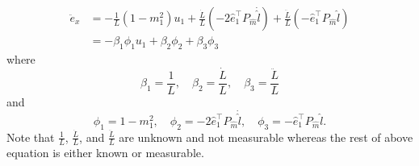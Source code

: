\begin{align}
\ddot{e}_x&=-\frac{1}{L}(1-m_1^2)u_1+\frac{\dot{L}}{L}(-2\hat{e}_1^{\top}P_{\hat{m}}\dot{\hat{l}})+\frac{\ddot{L}}{L}(-\hat{e}_1^{\top}P_{\hat{m}}\hat{l})
\\&=-\beta_1\phi_1u_1+\beta_2\phi_2+\beta_3\phi_3
\label{exddot}
\end{align} 
where
\begin{equation}
\beta_1=\frac{1}{L},\quad \beta_2=\frac{\dot{L}}{L}, \quad \beta_3=\frac{\ddot{L}}{L}
\end{equation}
and
\begin{equation}
\phi_1=1-m_1^2,\quad \phi_2=-2\hat{e}_1^{\top}P_{\hat{m}}\dot{\hat{l}}, \quad \phi_3=-\hat{e}_1^{\top}P_{\hat{m}}\hat{l}.
\end{equation}
Note that $\frac{1}{L}$, $\frac{\dot{L}}{L}$, and $\frac{\ddot{L}}{L}$ are unknown and not measurable whereas the rest of above equation is either known or measurable.


